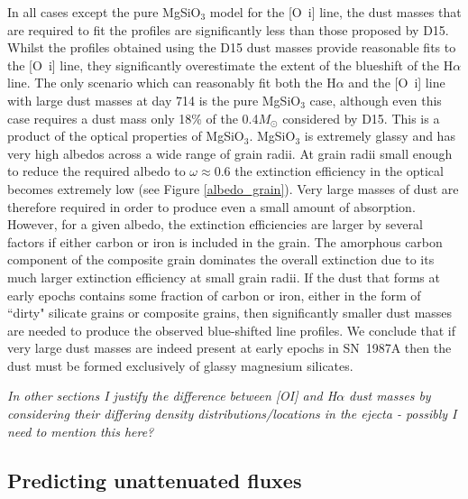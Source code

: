 \documentclass[useAMS,usenatbib,usegraphicx]{mnras}
\begin{document}
In all cases except the pure MgSiO$_3$ model for the [O~{\sc i}] line, the dust masses that are required to fit the profiles are significantly less than those proposed by D15.  Whilst the profiles obtained using the D15 dust masses provide reasonable fits to the [O~{\sc i}] line, they significantly overestimate the extent of the blueshift of the H$\alpha$ line.  The only scenario which can reasonably fit both the H$\alpha$ and the [O~{\sc i}] line with large dust masses at day 714 is the pure MgSiO$_3$ case, although even this case requires a dust mass only 18\% of the 0.4$M_{\odot}$ considered by D15.  This is a product of the optical properties of MgSiO$_3$.  MgSiO$_3$ is extremely glassy and has very high albedos across a  wide range of grain radii.  At grain radii small enough to reduce the required albedo to $\omega \approx 0.6$ the extinction efficiency in the optical becomes extremely low (see Figure \ref{albedo_grain}).  Very large masses of dust are therefore required in order to produce even a small amount of absorption.  However, for a given albedo, the extinction efficiencies are larger by several factors if either carbon or iron is included in the grain.  The amorphous carbon component of the composite grain dominates the overall extinction due to its much larger extinction efficiency at small grain radii.   If the dust that forms at early epochs contains some fraction of carbon or iron, either in the form of ``dirty" silicate grains or composite grains, then significantly smaller dust masses are needed to produce the observed blue-shifted line profiles.  We conclude that if very large dust masses are indeed present at early epochs in SN~1987A then the dust must be formed exclusively of glassy magnesium silicates.

\textit{In other sections I justify the difference between [OI] and H$\alpha$ dust masses by considering their differing density distributions/locations in the ejecta - possibly I need to mention this here?}







\subsection{Predicting unattenuated fluxes}
\end{document}
